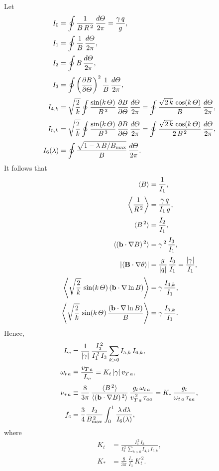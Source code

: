 \documentclass[12pt]{article}
\begin{document}
Let
\begin{align}
I_0 &= \oint \frac{1}{B\,R^{\,2}}\,\frac{d{\mit\Theta}}{2\pi}=\frac{\gamma\,q}{g},\\[0.5ex]
I_1 &=\oint \frac{1}{B}\,\frac{d{\mit\Theta}}{2\pi},\\[0.5ex]
I_2 &=\oint B\,\frac{d{\mit\Theta}}{2\pi},\\[0.5ex]
I_3 &=\oint\left(\frac{\partial B}{\partial{\mit\Theta}}\right)^2\frac{1}{B}\,\frac{d{\mit\Theta}}{2\pi},\\[0.5ex]
I_{4,k}&= \sqrt{\frac{2}{k}}\oint \frac{\sin(k\,{\mit\Theta})}{B^{\,2}}\,\frac{\partial B}{\partial{\mit\Theta}}\,\frac{d{\mit\Theta}}{2\pi}=\oint\frac{\sqrt{2\,k}\,\cos(k\,{\mit\Theta})}{B}\,\frac{d{\mit\Theta}}{2\pi},\\[0.5ex]
I_{5,k} &= \sqrt{\frac{2}{k}}\oint \frac{\sin(k\,{\mit\Theta})}{B^{\,3}}\,\frac{\partial B}{\partial{\mit\Theta}}\,\frac{d{\mit\Theta}}{2\pi}=\oint\frac{\sqrt{2\,k}\,\cos(k\,{\mit\Theta})}{2\,B^{\,2}}\,\frac{d{\mit\Theta}}{2\pi},\\[0.5ex]
I_6(\lambda) &=\oint \frac{\sqrt{1-\lambda\,B/B_{\rm max}}}{B}\,\frac{d{\mit\Theta}}{2\pi}.
\end{align}
It follows that
\begin{align}
\langle B\rangle &= \frac{1}{I_1},\\[0.5ex]
\left\langle \frac{1}{R^{\,2}}\right\rangle&= \frac{\gamma\,q}{I_1\,g},\\[0.5ex]
\langle B^{\,2}\rangle &= \frac{I_2}{I_1},\\[0.5ex]
\langle ({\bf b}\cdot\nabla B)^{\,2}\rangle&= \gamma^{\,2}\,\frac{I_3}{I_1},\\[0.5ex]
|\langle {\bf B}\cdot \nabla \theta\rangle|&= \frac{g}{|q|}\,\frac{I_0}{I_1} = \frac{|\gamma|}{I_1},
\\[0.5ex]
\left\langle \sqrt{\frac{2}{k}}\,\sin(k\,{\mit\Theta}) \,({\bf b}\cdot\nabla \ln B)\right\rangle &= \gamma\,\frac{I_{4,k}}{I_1},\\[0.5ex]
\left\langle \sqrt{\frac{2}{k}}\,\sin(k\,{\mit\Theta}) \,\frac{({\bf b}\cdot\nabla \ln B)}{B}\right\rangle &= \gamma\,\frac{I_{5,k}}{I_1}.
\end{align}
Hence,
\begin{align}
L_c &= \frac{1}{|\gamma|}\,\frac{I_2^{\,2}}{I_1^{\,2}\,I_3}\sum_{k>0}
I_{5,k}\,I_{6,k},\\[0.5ex]
\omega_{t\,a}&\equiv \frac{v_{T\,a}}{L_c} = K_{t}\,|\gamma|\,v_{T\,a},\\[0.5ex]
\nu_{\ast\,a} &\equiv \frac{8}{3\pi}\,\frac{\langle B^{\,2}\rangle}{\langle
({\bf b}\cdot\nabla B)^{\,2}\rangle}\,\frac{g_t\,\omega_{t\,a}}{v_{T\,a}^{\,2}\,\tau_{aa}}= K_{\ast}\,\frac{g_t}{\omega_{t\,a}\,\tau_{aa}},\\[0.5ex]
f_c &=\frac{3}{4} \frac{I_2}{B_{\rm max}^{\,2}}\int_0^{1}\frac{\lambda\,d\lambda}{I_6(\lambda)},
\end{align}
where 
\begin{align}
K_{t} &= \frac{I_1^{\,2}\,I_3}{I_2^{\,2}\,\sum_{k>0}I_{4,k}\,I_{5,k}},\\[0.5ex]
K_{\ast}&= \frac{8}{3\pi}\,\frac{I_2}{I_3}\,K_{t}^{\,2}.
\end{align}
\end{document}
